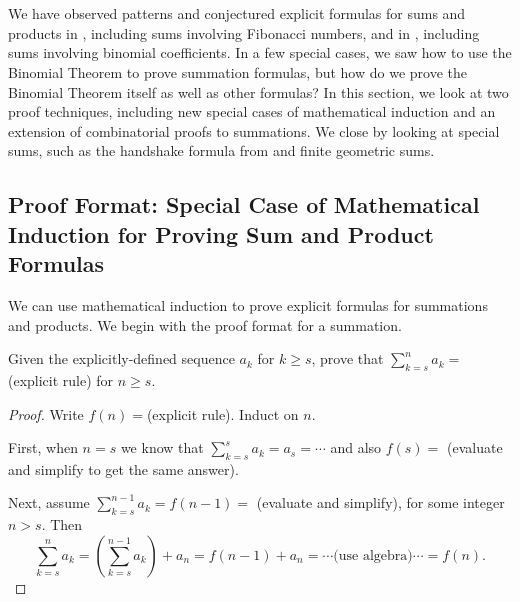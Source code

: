 \section{\secsumproofs}
\label{sec_sum_proofs}

We have observed patterns and conjectured explicit formulas for sums and products in , including sums involving Fibonacci numbers, and in , including sums involving binomial coefficients.  In a few special cases, we saw how to use the Binomial Theorem to prove summation formulas, but how do we prove the Binomial Theorem itself as well as other formulas?  In this section, we look at two proof techniques, including new special cases of mathematical induction and an extension of combinatorial proofs to summations.  We close by looking at special sums, such as the handshake formula from  and finite geometric sums.


\newcommand{\subpffsumproofsind}{Proof Format: Special Case of Mathematical Induction for Proving Sum and Product Formulas}
\subsection{\subpffsumproofsind}
\label{sub_pff_sum_proofs_induction}

We can use mathematical induction to prove explicit formulas for summations and products. We begin with the proof format for a summation.

\begin{pff}
\label{pff_math_ind_sum}
    Given the explicitly-defined sequence $a_k$ for $k \ge s$, prove that $\displaystyle \sum_{k=s}^na_k=$ (explicit rule) for $n \ge s$.
    \begin{proof}
        Write $f(n) = $(explicit rule).  Induct on $n$.

        First, when $n=s$ we know that $\displaystyle \sum_{k=s}^sa_k=a_s= \cdots $ and also $f(s)=$ (evaluate and simplify to get the same answer).

        Next, assume $\displaystyle \sum_{k=s}^{n-1}a_k=f(n-1)= $ (evaluate and simplify), for some integer $n > s$.  Then 
            $$\sum_{k=s}^na_k 
            = \left(\sum_{k=s}^{n-1}a_k\right) + a_n
            = f(n-1) + a_n  
            = \cdots \text{(use algebra)} \cdots 
            = f(n).$$
    \end{proof}
\end{pff}

